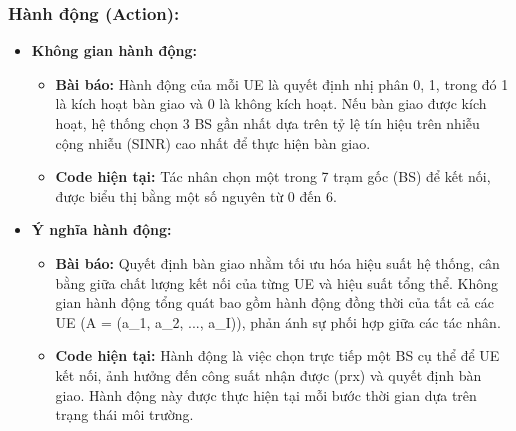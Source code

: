 \documentclass{article} %
\begin{document}
   \subsubsection{Hành động (Action):}
    \begin{itemize}
        \item \textbf{Không gian hành động:} 
        \begin{itemize}
            \item \textbf{Bài báo:} Hành động của mỗi UE là quyết định nhị phân {0, 1}, trong đó 1 là kích hoạt bàn giao và 0 là không kích hoạt. Nếu bàn giao được kích hoạt, hệ thống chọn 3 BS gần nhất dựa trên tỷ lệ tín hiệu trên nhiễu cộng nhiễu (SINR) cao nhất để thực hiện bàn giao.
        \item \textbf{Code hiện tại:} Tác nhân chọn một trong 7 trạm gốc (BS) để kết nối, được biểu thị bằng một số nguyên từ 0 đến 6.
        \end{itemize}
        \item \textbf{Ý nghĩa hành động:} 
        \begin{itemize}
            \item \textbf{Bài báo:} Quyết định bàn giao nhằm tối ưu hóa hiệu suất hệ thống, cân bằng giữa chất lượng kết nối của từng UE và hiệu suất tổng thể. Không gian hành động tổng quát bao gồm hành động đồng thời của tất cả các UE (A = (a\_1, a\_2, ..., a\_I)), phản ánh sự phối hợp giữa các tác nhân.
        \item \textbf{Code hiện tại:} Hành động là việc chọn trực tiếp một BS cụ thể để UE kết nối, ảnh hưởng đến công suất nhận được (prx) và quyết định bàn giao. Hành động này được thực hiện tại mỗi bước thời gian dựa trên trạng thái môi trường.
        \end{itemize}        
    \end{itemize}
\end{document}
